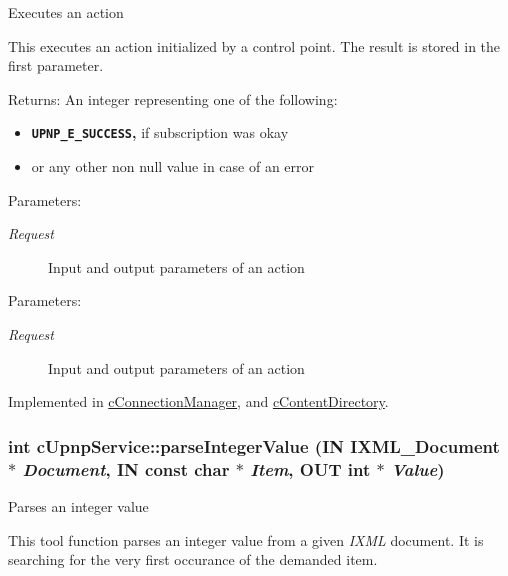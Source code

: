 Executes an action

This executes an action initialized by a control point. The result is stored in the first parameter.

\begin{Desc}
\item[Returns:]An integer representing one of the following:\begin{itemize}
\item {\bf {\tt UPNP\_\-E\_\-SUCCESS},} if subscription was okay\item or any other non null value in case of an error\end{itemize}
\end{Desc}
\begin{Desc}
\item[Parameters:]
\begin{description}
\item[{\em Request}]Input and output parameters of an action \end{description}
\end{Desc}
\begin{Desc}
\item[Parameters:]
\begin{description}
\item[{\em Request}]Input and output parameters of an action \end{description}
\end{Desc}


Implemented in \hyperlink{classcConnectionManager_12fa6b0a9e20c3af663e3ca2b3c97dfb}{cConnectionManager}, and \hyperlink{classcContentDirectory_a0225df761512819b9c46f45b2a0f0d0}{cContentDirectory}.\hypertarget{classcUpnpService_846cd44a1c014395278c3af339122656}{
\subsubsection[{parseIntegerValue}]{\setlength{\rightskip}{0pt plus 5cm}int cUpnpService::parseIntegerValue (IN IXML\_\-Document $\ast$ {\em Document}, \/  IN const char $\ast$ {\em Item}, \/  OUT int $\ast$ {\em Value})}}
\label{classcUpnpService_846cd44a1c014395278c3af339122656}


Parses an integer value

This tool function parses an integer value from a given {\em IXML\/} document. It is searching for the very first occurance of the demanded item.

